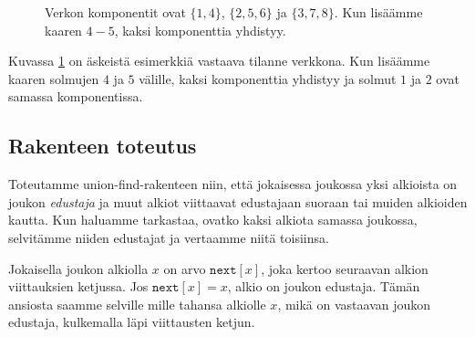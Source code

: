 \begin{figure}
\center
\begin{center}
\end{center}
\caption{Verkon komponentit ovat $\{1,4\}$, $\{2,5,6\}$ ja $\{3,7,8\}$.
Kun lisäämme kaaren $4-5$, kaksi komponenttia yhdistyy.}
\label{fig:veryhd}
\end{figure}

Kuvassa \ref{fig:veryhd} on äskeistä esimerkkiä vastaava tilanne verkkona.
Kun li\-säämme kaaren solmujen $4$ ja $5$ välille,
kaksi komponenttia yhdistyy ja solmut $1$ ja $2$
ovat samassa komponentissa.

\subsection{Rakenteen toteutus}

Toteutamme union-find-rakenteen niin, että jokaisessa joukossa
yksi alkioista on joukon \emph{edustaja} ja muut alkiot viittaavat
edustajaan suoraan tai muiden alkioiden kautta.
Kun haluamme tarkastaa, ovatko kaksi alkiota samassa joukossa,
selvitämme niiden edustajat ja vertaamme niitä toisiinsa.

Jokaisella joukon alkiolla $x$ on arvo $\texttt{next}[x]$,
joka kertoo seuraavan alkion viittauksien ketjussa.
Jos $\texttt{next}[x]=x$, alkio on joukon edustaja.
Tämän ansiosta saamme selville mille tahansa alkiolle $x$,
mikä on vastaavan joukon edustaja, kulkemalla läpi viittausten ketjun.

